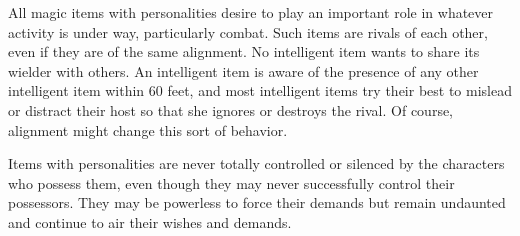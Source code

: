 All magic items with personalities desire to play an important role in whatever 
activity is under way, particularly combat. Such items are rivals of each other, 
even if they are of the same alignment. No intelligent item wants to share its 
wielder with others. An intelligent item is aware of the presence of any other 
intelligent item within 60 feet, and most intelligent items try their best to mislead 
or distract their host so that she ignores or destroys the rival. Of course, alignment 
might change this sort of behavior. 

Items with personalities are never totally controlled or silenced by the characters 
who possess them, even though they may never successfully control their possessors. 
They may be powerless to force their demands but remain undaunted and continue 
to air their wishes and demands.

